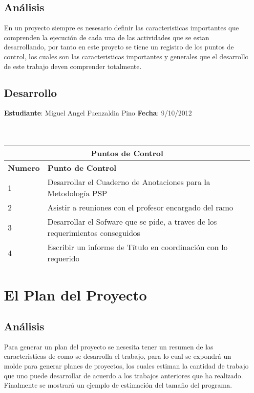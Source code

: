 \documentclass[a4paper,12pt,openany,oneside]{book}
\begin{document}
\section{Análisis}
En un proyecto siempre es nesesario definir las caracteristicas importantes que comprenden la ejecución de cada una de las actividades que se estan desarrollando, por tanto en este proyeto se tiene un registro de los puntos de control, los cuales son las caracteristicas importantes y generales que el desarrollo de este trabajo deven comprender totalmente.
\section{Desarrollo}
\newpage
\textbf{Estudiante}: Miguel Angel Fuenzaldia Pino     \textbf{Fecha}: 9/10/2012\\\\\
\begin{tabular}{| l | l |}
\hline
\multicolumn{2}{|c|}{\textbf{Puntos de Control}}\\
\hline
\textbf{Numero} & \textbf{Punto de Control}\\
\hline
1 & Desarrollar el Cuaderno de Anotaciones para la Metodología PSP \\
\hline
2 & Asistir a reuniones con el profesor encargado del ramo \\
\hline
3 & Desarrollar el Sofware que se pide, a traves de los requerimientos conseguidos \\
\hline
4 & Escribir un informe de Título en coordinación con lo requerido\\
\hline
\end{tabular}
\chapter{El Plan del Proyecto}
\thispagestyle{empty}
\section{Análisis}
Para generar un plan del proyecto se nesesita tener un resumen de las caracteristicas de como se desarrolla el trabajo, para lo cual se expondrá un molde para generar planes de proyectos, los cuales estiman la cantidad de trabajo que uno puede desarrollar de acuerdo a los trabajos anteriores que ha realizado. Finalmente se mostrará un ejemplo de estimación del tamaño del programa.
\end{document}

